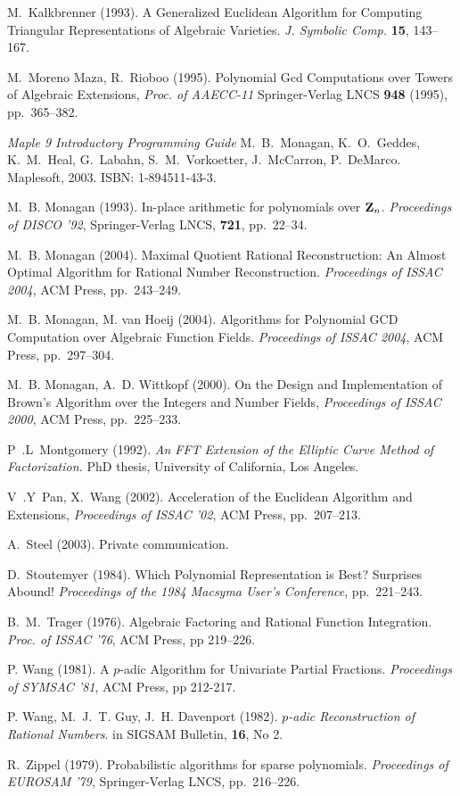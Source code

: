 \documentclass[10pt]{article}
\begin{document}
\begin{thebibliography}{}
 M.~Kalkbrenner (1993).
A Generalized Euclidean Algorithm for Computing
Triangular Representations of Algebraic Varieties.
{\it J. Symbolic Comp.} {\bf 15}, 143--167.

 M.~Moreno Maza, R.~Rioboo (1995).
Polynomial Gcd Computations over Towers of Algebraic Extensions,
{\it Proc. of AAECC-11} Springer-Verlag LNCS {\bf 948} (1995), pp.~365--382.

{\it Maple 9 Introductory Programming Guide}
M.~B.~Monagan, K.~O.~Geddes, K.~M.~Heal, G.~Labahn,
S.~M.~Vorkoetter, J.~McCarron, P.~DeMarco.
Maplesoft, 2003.  ISBN: 1-894511-43-3.

 M.~B. Monagan (1993).
In-place arithmetic for polynomials over ${\bf Z}_n$.
{\it Proceedings of DISCO '92}, Springer-Verlag LNCS, {\bf 721}, pp.~22--34.

 M.~B. Monagan (2004).
Maximal Quotient Rational Reconstruction: An Almost Optimal
Algorithm for Rational Number Reconstruction. 
{\it Proceedings of ISSAC 2004}, ACM Press, pp.~243--249.

 M.~B. Monagan, M. van Hoeij (2004).
Algorithms for Polynomial GCD Computation over Algebraic Function Fields.
{\it Proceedings of ISSAC 2004}, ACM Press, pp.~297--304.

M.~B. Monagan, A.~D. Wittkopf (2000).
On the Design and Implementation of Brown's
Algorithm over the Integers and Number Fields,
{\it Proceedings of ISSAC 2000}, ACM Press, pp.~225--233.

 P~.L~Montgomery (1992).
{\it An FFT Extension of the Elliptic Curve Method of Factorization.}
PhD thesis, University of California, Los Angeles.

 V~.Y~Pan, X.~Wang (2002).
Acceleration of the Euclidean Algorithm and Extensions,
{\it Proceedings of ISSAC '02}, ACM Press, pp.~207--213.

 A.~Steel (2003). Private communication.

 D.~Stoutemyer (1984).
Which Polynomial Representation is Best?  Surprises Abound!
{\it Proceedings of the 1984 Macsyma User's Conference},
pp.~221--243.

 B.~M.~Trager (1976).
Algebraic Factoring and Rational Function Integration.
{\it Proc. of ISSAC '76}, ACM Press, pp 219--226.

 P. Wang (1981).
A $p$-adic Algorithm for Univariate Partial Fractions.
{\it Proceedings of SYMSAC '81}, ACM Press, pp 212-217.

 P. Wang, M.~J.~T. Guy, J.~H. Davenport (1982).
{\em $p$-adic Reconstruction of Rational Numbers}.
in SIGSAM Bulletin, {\bf 16}, No 2.

 R.~Zippel (1979).
Probabilistic algorithms for sparse polynomials.
{\it Proceedings of EUROSAM '79}, Springer-Verlag LNCS, pp.~216--226.

\end{thebibliography}
\end{document}
